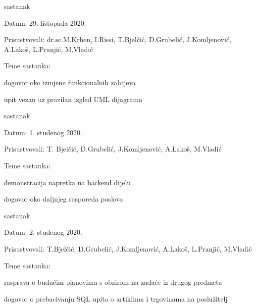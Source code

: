 \begin{packed_enum}
			\item  sastanak
			\item[] \begin{packed_item}
				\item Datum: 29. listopada 2020.
				\item Prisustvovali: dr.sc.M.Krhen, I.Rissi, T.Bjelčić, D.Grubelić, J.Komljenović, A.Lakoš, L.Pranjić, M.Vladić
				\item Teme sastanka:
				\begin{packed_item}
					\item  dogovor oko izmjene funkcionalnih zahtjeva
					\item  upit vezan uz pravilan izgled UML dijagrama
				\end{packed_item}
			\end{packed_item}
			
			\item  sastanak
			\item[] \begin{packed_item}
				\item Datum: 1. studenog 2020.
				\item Prisustvovali: T. Bjelčić, D.Grubelić, J.Komljenović, A.Lakoš, M.Vladić
				\item Teme sastanka:
				\begin{packed_item}
					\item  demonstracija napretka na backend dijelu
					\item  dogovor oko daljnjeg rasporeda poslova
				\end{packed_item}
			\end{packed_item}
			
			\item  sastanak
			\item[] \begin{packed_item}
				\item Datum: 2. studenog 2020.
				\item Prisustvovali: T.Bjelčić, D.Grubelić, J.Komljenović, A.Lakoš, L.Pranjić, M.Vladić
				\item Teme sastanka:
				\begin{packed_item}
					\item  rasprava o budućim planovima s obzirom na zadaće iz drugog predmeta
					\item  dogovor o prebacivanju SQL upita o artiklima i trgovinama na poslužitelj
				\end{packed_item}
			\end{packed_item}
			

\end{packed_enum}
